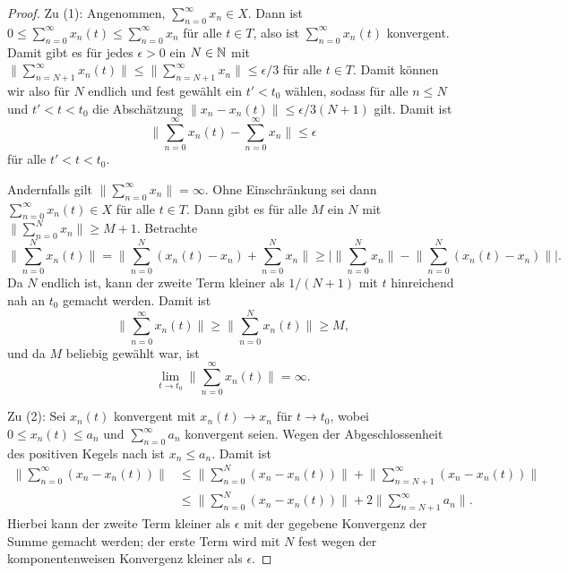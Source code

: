 \begin{proof}
\par
Zu (1): Angenommen, $\sum_{n=0}^\infty x_n\in X$.  Dann ist $0\leq\sum_{n=0}^\infty x_n(t)\leq\sum_{n=0}^\infty x_n$ für alle $t\in T$, also ist $\sum_{n=0}^\infty x_n(t)$ konvergent. Damit gibt es für jedes $\epsilon>0$ ein $N\in\mathbb{N}$ mit $\|\sum_{n=N+1}^\infty x_n(t)\|\leq \|\sum_{n=N+1}^\infty x_n\|\leq \epsilon/3$ für alle $t\in T$. Damit können wir also für $N$ endlich und fest gewählt ein $t'< t_0$ wählen, sodass für alle  $n\leq N$ und $t'< t< t_0$ die Abschätzung $\|x_n -x_n(t)\|\leq \epsilon /3(N+1)$ gilt. Damit ist 
\begin{equation*}
\Big\|\sum_{n=0}^\infty x_n(t) - \sum_{n=0}^\infty x_n\Big \|\leq \epsilon
\end{equation*}
für alle $t'< t< t_0$. 

\par
Andernfalls gilt $\|\sum_{n=0}^\infty x_n\|=\infty$. Ohne Einschränkung sei dann $\sum_{n=0}^\infty x_n(t)\in X$ für alle $t\in T$. Dann gibt es für alle $M$ ein $N$ mit $\|\sum_{n=0}^N  x_n\|\geq M+1$. Betrachte
\begin{equation*}
\Big\|\sum_{n=0}^N x_n(t)\Big\|= \Big \|\sum_{n=0}^N (x_n(t)- x_n) + \sum_{n=0}^N x_n \Big \| \geq \Bigg |\Big \|  \sum_{n=0}^N x_n\Big \| - \Big \| \sum_{n=0}^N (x_n (t) - x_n)\Big \|\Bigg |.
\end{equation*}
Da $N$ endlich ist, kann der zweite Term kleiner als $1/(N+1)$ mit $t$ hinreichend nah an $t_0$ gemacht werden. Damit ist
\begin{equation*}
\Big \|\sum_{n=0}^\infty x_n (t)\Big\|\geq \Big\|\sum_{n=0}^N x_n(t)\Big \|\geq M,
\end{equation*}
und da $M$ beliebig gewählt war, ist
\begin{equation*}
\lim_{t\to t_0}\Big \|\sum_{n=0}^\infty x_n (t)\Big \| = \infty.
\end{equation*}

\par
Zu (2): Sei $x_n(t)$ konvergent mit $x_n(t)\to x_n$ für $t\to t_0$, wobei $0\leq x_n(t)\leq a_n$ und $\sum_{n=0}^\infty a_n$ konvergent seien. Wegen der Abgeschlossenheit des positiven Kegels nach \Cref{} ist $x_n\leq a_n$. Damit ist
\begin{align*}
\Big\|\sum_{n=0}^\infty (x_n - x_n(t))\Big\| 
&\leq \Big\|\sum_{n=0}^N (x_n - x_n(t))\Big\| + \Big\|\sum_{n=N+1}^\infty (x_n- x_n(t))\Big\|\\
&\leq \Big\|\sum_{n=0}^N (x_n - x_n(t))\Big \|+  2 \Big \|\sum_{n=N+1}^\infty  a_n \Big \|.
\end{align*}
Hierbei kann der zweite Term kleiner als $\epsilon$ mit der gegebene Konvergenz der Summe gemacht werden; der erste Term wird mit $N$ fest wegen der komponentenweisen Konvergenz kleiner als $\epsilon$.
\end{proof}

